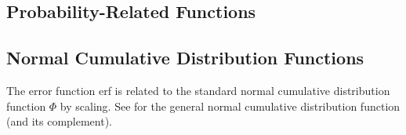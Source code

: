 \begin{description}
\begin{description}
\begin{description}
\begin{description}
\begin{description}
\begin{description}
\begin{description}
\begin{description}
\begin{description}
\begin{description}
\begin{description}
\begin{description}
\begin{description}
\begin{description}
\begin{description}
\begin{description}
\begin{description}
\begin{description}
\begin{description}
\begin{description}
\begin{description}   %



\section{Probability-Related Functions}

\subsection{Normal Cumulative Distribution Functions}

The error function erf is related to the standard normal cumulative distribution function $\Phi$ by scaling.  See  for the general normal cumulative distribution function (and its complement).


\end{description}
\end{description}
\end{description}
\end{description}
\end{description}
\end{description}
\end{description}
\end{description}
\end{description}
\end{description}
\end{description}
\end{description}
\end{description}
\end{description}
\end{description}
\end{description}
\end{description}
\end{description}
\end{description}
\end{description}
\end{description}
